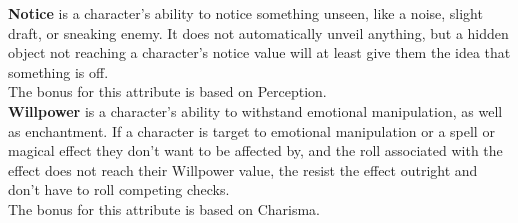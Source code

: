 \textbf{Notice}\label{stat:notice} is a character's ability to notice something unseen, like a noise, slight draft, or sneaking enemy.
It does not automatically unveil anything, but a hidden object not reaching a character's notice value will at least give them the idea that something is off.\\
The bonus for this attribute is based on Perception.\\

\textbf{Willpower}\label{stat:willpower} is a character's ability to withstand emotional manipulation, as well as enchantment.
If a character is target to emotional manipulation or a spell or magical effect they don't want to be affected by, and the roll associated with the effect does not reach their Willpower value, the resist the effect outright and don't have to roll competing checks.\\
The bonus for this attribute is based on Charisma.\\